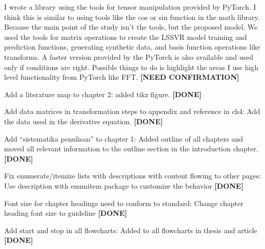\documentclass[a4paper,12pt]{scrreprt}
\begin{document}
\begin{numdesc}
    I wrote a library using the tools for tensor manipulation provided by PyTorch. I think this is similar to using tools like the cos or sin function in the math library. Because the main point of the study isn't the tools, but the proposed model. We used the tools for matrix operations to create the LSSVR model training and prediction functions, generating synthetic data, and basis function operations like transforms. A faster version provided by the PyTorch is also available and used only if conditions are right. Possible things to do is highlight the areas I use high level functionality from PyTorch like FFT\@. \textbf{[NEED CONFIRMATION]}
    \item[Add a literature map to chapter 2:] added tikz figure. \textbf{[DONE]}
    \item[Add data matrices in transformation steps to appendix and reference in ch4:] Add the data used in the derivative equation. \textbf{[DONE]}
    \item[Add \enquote{sistematika penulisan} to chapter 1:] Added outline of all chapters and moved all relevant information to the outline section in the introduction chapter. \textbf{[DONE]}
    \item[Fix enumerate/itemize lists with descriptions with content flowing to other pages:] Use description with enumitem package to customize the behavior \textbf{[DONE]}
    \item[Font size for chapter headings need to conform to standard:] Change chapter heading font size to guideline \textbf{[DONE]}
    \item[Add start and stop in all flowcharts:] Added to all flowcharts in thesis and article \textbf{[DONE]}
\end{numdesc}
\end{document}
